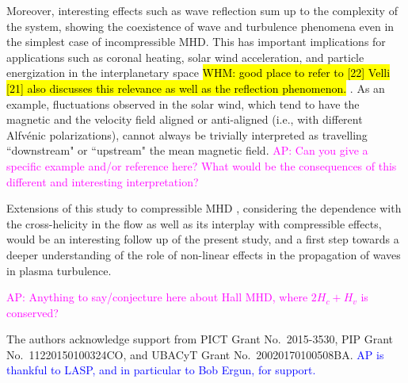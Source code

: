 \documentclass[aip,pop,reprint,amsmath,amssymb,floatfix]{revtex4-1}
\def\ADD#1{{\textcolor{blue}{#1}}}
\def\AD#1{{\textcolor{magenta}{#1}}}
\def\WHM#1{{\hl{WHM: #1}}}
\begin{document}
Moreover, interesting effects such as wave reflection sum up to the complexity of the system, showing the coexistence of wave and turbulence phenomena even in the simplest case of incompressible MHD. This has important implications for applications such as coronal heating, solar wind acceleration, and particle energization in the interplanetary space \WHM{good place to refer to [22]
Velli [21] also discusses this relevance as well as the reflection phenomenon. }. As an example, fluctuations observed in the solar wind, which tend to have the magnetic and the velocity field aligned or anti-aligned (i.e., with different Alfv\'enic polarizations), cannot always be trivially interpreted as travelling ``downstream" or ``upstream" the mean magnetic field. 
\AD{AP: Can you give a specific example and/or reference here? What would be the consequences of this different and interesting interpretation?}

Extensions of this study to compressible MHD \cite{andres_2017_interplay}, considering the dependence with the cross-helicity in the flow as well as its interplay with compressible effects, would be an interesting follow up of the present study, and a first step towards a deeper understanding of the role of non-linear effects in the propagation of waves in plasma turbulence.

\AD{AP: Anything to say/conjecture here about Hall MHD, where $2H_c+H_v$ is conserved?}

\acknowledgments
The authors acknowledge support from PICT Grant No.~2015-3530, PIP Grant No.~11220150100324CO, and UBACyT Grant No.~20020170100508BA.
\ADD{AP is thankful to LASP, and in particular to Bob Ergun, for support.}



\end{document}
